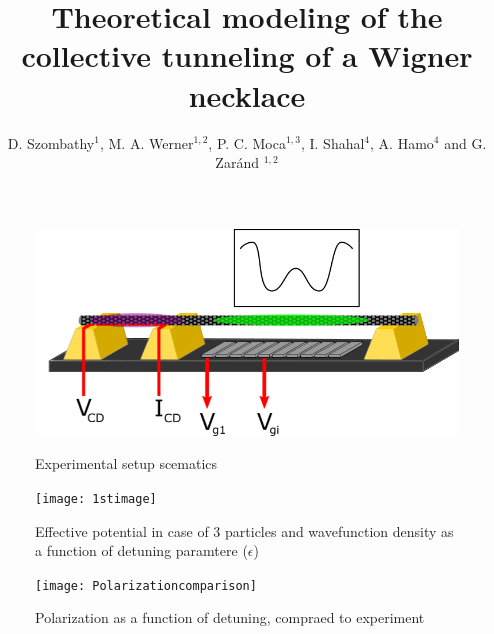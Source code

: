 \documentclass[aps,prb, 10pt]{revtex4-2}
\begin{document}
\title{Theoretical modeling of the collective tunneling of a Wigner necklace}

\author{D. Szombathy$^1$, M. A. Werner$^{1, 2}$, P. C. Moca$^{1, 3}$, I. Shahal$^{4}$, A. Hamo$^{4}$ and G. Zaránd $^{1,2}$}


\begin{abstract}
	
\end{abstract}

\maketitle

\begin{figure}[h]
\centering
\includegraphics[width=1\textwidth]{Experimental Setup}
\label{ExperimentalSetup}
\caption{Experimental setup scematics}
\end{figure}

\begin{figure}[h]
\centering
\texttt{[image: 1stimage]}
\label{1stImage}
\caption{Effective potential in case of 3 particles and wavefunction density as a function of detuning paramtere ($\epsilon$)}
\end{figure}

\begin{figure}[h]
\centering
\texttt{[image: Polarizationcomparison]}
\label{2ndImage}
\caption{Polarization as a function of detuning, compraed to experiment}
\end{figure}
\end{document}
